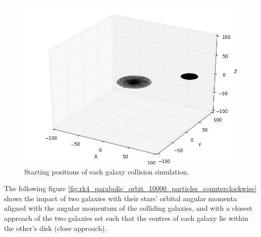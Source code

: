 \documentclass[10pt,letterpaper]{article}
\begin{document}
\begin{figure}[!htb]
\centering
\includegraphics[scale=0.55]{figures/galaxy_collisions/galaxy_collision_initialized.png}
\caption{Starting positions of each galaxy collision simulation.}\label{fig:galaxy_collision_initialized}
\end{figure}

The following figure \ref{fig:rk4_parabolic_orbit_10000_particles_counterclockwise} shows the impact of two galaxies with their stars' orbital angular momenta aligned with the angular momentum of the colliding galaxies, and with a closest approach of the two galaxies set such that the centres of each galaxy lie within the other's disk (close approach).\\
\end{document}
